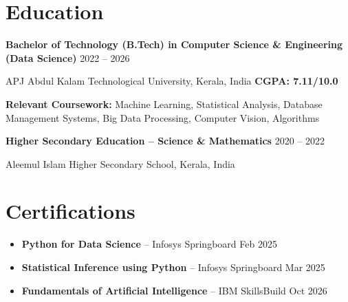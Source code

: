 \documentclass[10pt,a4paper]{article}
\newcommand{\resumeEducation}[4]{
    \textbf{\color{heading}#1}
    \hfill
    {\small #2}

    {\small #3}
    \hfill
    {\small\textbf{#4}}
}
\begin{document}

\section{Education}

\resumeEducation
{Bachelor of Technology (B.Tech) in Computer Science \& Engineering (Data Science)}
{2022 -- 2026}
{APJ Abdul Kalam Technological University, Kerala, India}
{CGPA: 7.11/10.0}

\vspace{2pt}

{\small
\textbf{Relevant Coursework:}
Machine Learning, Statistical Analysis, Database Management Systems,
Big Data Processing, Computer Vision, Algorithms
}

\vspace{4pt}

\resumeEducation
{Higher Secondary Education -- Science \& Mathematics}
{2020 -- 2022}
{Aleemul Islam Higher Secondary School, Kerala, India}
{}


\section{Certifications}

\begin{itemize}

    \item \textbf{Python for Data Science} -- Infosys Springboard
    \hfill Feb 2025

    \item \textbf{Statistical Inference using Python} -- Infosys Springboard
    \hfill Mar 2025

    \item \textbf{Fundamentals of Artificial Intelligence} -- IBM SkillsBuild
    \hfill Oct 2026

\end{itemize}
\end{document}
